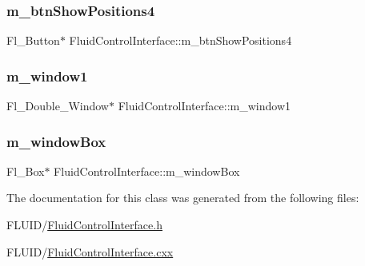 \subsubsection{\texorpdfstring{m\+\_\+btn\+Show\+Positions4}{m\_btnShowPositions4}}
{\footnotesize\ttfamily Fl\+\_\+\+Button$\ast$ Fluid\+Control\+Interface\+::m\+\_\+btn\+Show\+Positions4}

\mbox{\label{class_fluid_control_interface_ab318bb377679cd76946bb68fc505652f}} 
\subsubsection{\texorpdfstring{m\+\_\+window1}{m\_window1}}
{\footnotesize\ttfamily Fl\+\_\+\+Double\+\_\+\+Window$\ast$ Fluid\+Control\+Interface\+::m\+\_\+window1}

\mbox{\label{class_fluid_control_interface_a04185b8fd0895dfc2b77a77c9eb61bc8}} 
\subsubsection{\texorpdfstring{m\+\_\+window\+Box}{m\_windowBox}}
{\footnotesize\ttfamily Fl\+\_\+\+Box$\ast$ Fluid\+Control\+Interface\+::m\+\_\+window\+Box}



The documentation for this class was generated from the following files\+:\begin{DoxyCompactItemize}
\item 
F\+L\+U\+I\+D/\hyperlink{_fluid_control_interface_8h}{Fluid\+Control\+Interface.\+h}\item 
F\+L\+U\+I\+D/\hyperlink{_fluid_control_interface_8cxx}{Fluid\+Control\+Interface.\+cxx}\end{DoxyCompactItemize}
